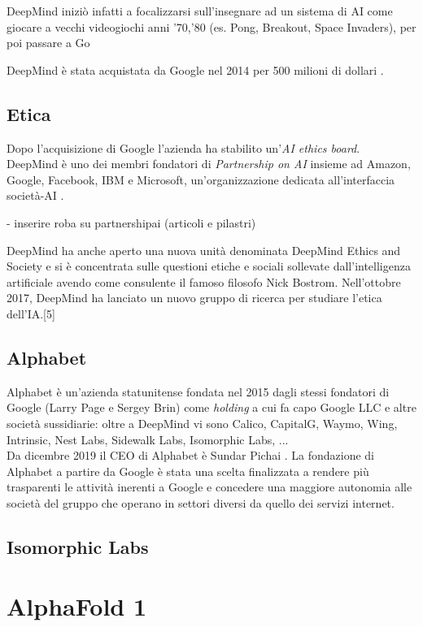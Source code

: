 \par DeepMind iniziò infatti a focalizzarsi sull'insegnare ad un sistema di AI come giocare a vecchi videogiochi anni '70,'80 (es. Pong, Breakout, Space Invaders), per poi passare a Go

DeepMind è stata acquistata da Google nel 2014 per 500 milioni di dollari \cite{Guardian2014}.

\subsection{Etica}
Dopo l'acquisizione di Google l'azienda ha stabilito un'\textit{AI ethics board}.\\
DeepMind è uno dei membri fondatori di \textit{Partnership on AI} insieme ad Amazon, Google, Facebook, IBM e Microsoft, un'organizzazione dedicata all'interfaccia società-AI \cite{partnershiponai}.

- inserire roba su partnershipai (articoli e pilastri)

DeepMind ha anche aperto una nuova unità denominata DeepMind Ethics and Society e si è concentrata sulle questioni etiche e sociali sollevate dall'intelligenza artificiale avendo come consulente il famoso filosofo Nick Bostrom. Nell'ottobre 2017, DeepMind ha lanciato un nuovo gruppo di ricerca per studiare l'etica dell'IA.[5]

\subsection{Alphabet}
Alphabet è un'azienda statunitense fondata nel 2015 dagli stessi fondatori di Google (Larry Page e Sergey Brin) come \textit{holding} a cui fa capo Google LLC e altre società sussidiarie: oltre a DeepMind vi sono Calico, CapitalG, Waymo, Wing, Intrinsic, Nest Labs, Sidewalk Labs, Isomorphic Labs, ...\\ 
Da dicembre 2019 il CEO di Alphabet è Sundar Pichai \cite{cnbc}.
La fondazione di Alphabet a partire da Google è stata una scelta finalizzata a rendere più trasparenti le attività inerenti a Google e concedere una maggiore autonomia alle società del gruppo che operano in settori diversi da quello dei servizi internet.

\subsection{Isomorphic Labs}



\section{AlphaFold 1}
